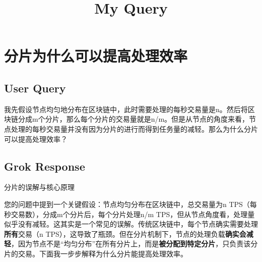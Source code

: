 \documentclass[a4paper,12pt]{ctexart}
\title{My Query}
\author{}
\date{}
\begin{document}
\maketitle
\vspace{-6em}
\section*{分片为什么可以提高处理效率}
\subsection*{User Query}
我先假设节点均匀地分布在区块链中，此时需要处理的每秒交易量是n。然后将区块链分成m个分片，那么每个分片的交易量就是n/m。但是从节点的角度来看，节点处理的每秒交易量并没有因为分片的进行而得到任务量的减轻。那么为什么分片可以提高处理效率？

\subsection*{Grok Response}
分片的误解与核心原理

您的问题中提到一个关键假设：节点均匀分布在区块链中，总交易量为n TPS（每秒交易数），分成m个分片后，每个分片处理n/m TPS，但从节点角度看，处理量似乎没有减轻。这其实是一个常见的误解。传统区块链中，每个节点确实需要处理\textbf{所有}交易（n TPS），这导致了瓶颈。但在分片机制下，节点的处理负载\textbf{确实会减轻}，因为节点不是“均匀分布”在所有分片上，而是\textbf{被分配到特定分片}，只负责该分片的交易。下面我一步步解释为什么分片能提高处理效率。
\end{document}
